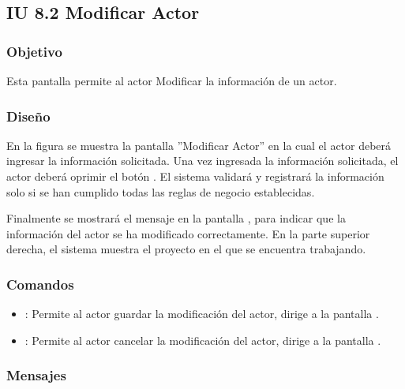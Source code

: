 \subsection{IU 8.2 Modificar Actor}

\subsubsection{Objetivo}
	Esta pantalla permite al actor Modificar la información de un actor.
\subsubsection{Diseño}
	En la figura  se muestra la pantalla ''Modificar Actor'' en la cual el actor deberá ingresar la información solicitada.
	Una vez ingresada la información solicitada, el actor deberá oprimir el botón  . El sistema validará y registrará la información solo si se han cumplido todas las reglas de negocio establecidas.
	
	Finalmente se mostrará el mensaje  en la pantalla , para indicar que la información del actor se ha modificado correctamente.
	En la parte superior derecha, el sistema muestra el proyecto en el que se encuentra trabajando.

\subsubsection{Comandos}
\begin{itemize}
	\item {}: Permite al actor guardar la modificación del actor, dirige a la pantalla .
	\item {}: Permite al actor cancelar la modificación del actor, dirige a la pantalla .
\end{itemize}

\subsubsection{Mensajes}

